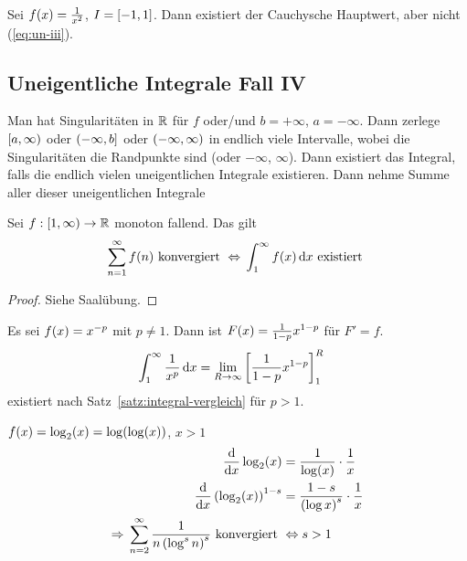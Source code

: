 \begin{beispiel}
    Sei $f\of{x} = \frac{1}{x^2}$, $I=\left[-1, 1\right]$. Dann existiert der Cauchysche Hauptwert, aber nicht (\ref{eq:un-iii}).
\end{beispiel}

\subsection{Uneigentliche Integrale Fall IV}

\begin{definition}
    Man hat Singularitäten in $\mathbb{R}$ für $f$ oder/und $b=+\infty$, $a=-\infty$. Dann zerlege $\left[a, \infty\right)$ oder $\left(-\infty, b\right]$ oder $\left(-\infty, \infty\right)$ in endlich viele Intervalle, wobei die Singularitäten die Randpunkte sind (oder $-\infty$, $\infty$). Dann existiert das Integral, falls die endlich vielen uneigentlichen Integrale existieren. Dann nehme Summe aller dieser uneigentlichen Integrale
\end{definition}

\begin{satz}[Integralvergleichskriterium] %
    \label{satz:integral-vergleich}
    Sei $f: \left[1, \infty\right) \rightarrow{}\mathbb{R}$ monoton fallend. Das gilt
    \begin{align*}
        \sum_{n=1}^{\infty}  f\of{n} \text{ konvergiert } \equivalent \int_{1}^{\infty} f\of{x} \dif x \text{ existiert }
    \end{align*}
    \begin{proof}
        Siehe Saalübung.
    \end{proof}
\end{satz}

\begin{beispiel}
    Es sei $f\of{x} = x^{-p}$ mit $p\neq 1$. Dann ist $F\of{x} = \frac{1}{1-p}x^{1-p}$ für $F'=f$.
    \begin{align*}
        \int_{1}^{\infty} \frac{1}{x^p} \mathop{}\!\mathrm{d} x &= \lim_{R\rightarrow{}\infty} \left[\frac{1}{1-p}x^{1-p}\right]_1^R
    \end{align*}
    existiert nach Satz~\ref{satz:integral-vergleich} für $p>1$.
\end{beispiel}

\begin{beispiel}
    $f\of{x} = \log_2\of{x} = \log\of{\log\of{x}}$, $x > 1$
    \begin{align*}
        \frac{\dif}{\dif x} \log_2\of{x} &= \frac{1}{\log\of{x}}\cdot\frac{1}{x}\\
        \frac{\dif}{\dif x}\pair{\log_2\of{x}}^{1-s} &= \frac{1-s}{\pair{\log x}^s}\cdot \frac{1}{x}\\
        \impl \sum_{n=2}^{\infty} \frac{1}{n\pair{\log^s n}^s} \text{ konvergiert } &\equivalent s > 1
    \end{align*}
\end{beispiel}

